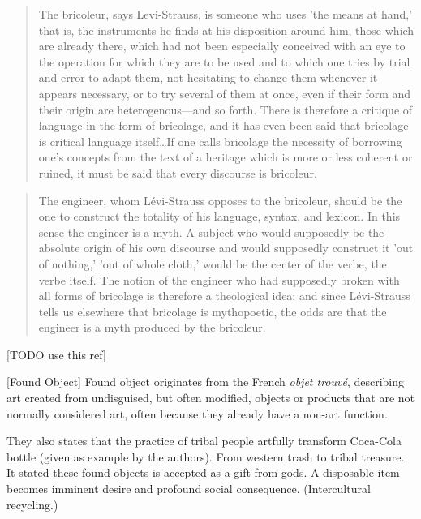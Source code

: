 \begin{quote}
The bricoleur, says Levi-Strauss, is someone who uses 'the means at hand,' that is, the instruments he finds at his disposition around him, those which are already there, which had not been especially conceived with an eye to the operation for which they are to be used and to which one tries by trial and error to adapt them, not hesitating to change them whenever it appears necessary, or to try several of them at once, even if their form and their origin are heterogenous---and so forth. There is therefore a critique of language in the form of bricolage, and it has even been said that bricolage is critical language itself\ldots If one calls bricolage the necessity of borrowing one's concepts from the text of a heritage which is more or less coherent or ruined, it must be said that every discourse is bricoleur.\cite{derrida1993structure}
\end{quote}

\begin{quote}
The engineer, whom Lévi-Strauss opposes to the bricoleur, should be the one to construct the totality of his language, syntax, and lexicon. In this sense the engineer is a myth. A subject who would supposedly be the absolute origin of his own discourse and would supposedly construct it 'out of nothing,' 'out of whole cloth,' would be the center of the verbe, the verbe itself. The notion of the engineer who had supposedly broken with all forms of bricolage is therefore a theological idea; and since Lévi-Strauss tells us elsewhere that bricolage is mythopoetic, the odds are that the engineer is a myth produced by the bricoleur.\cite{derrida1993structure}
\end{quote}

[TODO use this ref]\cite{strasser1999waste}



%
%
[Found Object] Found object originates from the French \textit{objet trouvé}, describing art created from undisguised, but often modified, objects or products that are not normally considered art, often because they already have a non-art function.

 They also states that the practice of tribal people artfully transform Coca-Cola bottle (given as example by the authors). From western trash to tribal treasure.  It stated these found objects is accepted as a gift from gods. A disposable item becomes imminent desire and profound social consequence. (Intercultural recycling.) 

